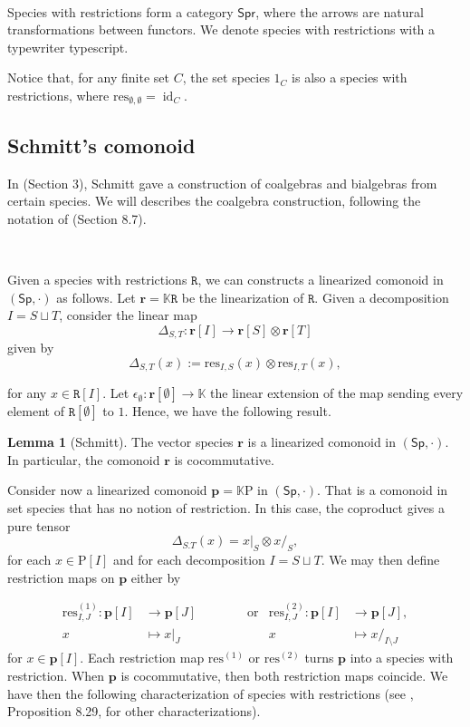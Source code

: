 \documentclass[12pt, reqno]{amsart}
\theoremstyle{definition}
\newtheorem{lm}[thm]{Lemma}
\DeclareMathOperator{\id}{id}
\newcommand{\Ss}{\mathsf{Sp}} %
\newcommand{\Spr}{\mathsf{Spr}} %
\newcommand{\rP}{\mathrm{P}}
\newcommand{\prR}{\mathtt{R}}
\newcommand{\tp}{\mathbf{p}}
\newcommand{\trr}{\mathbf{r}}
\begin{document}
\

Species with restrictions form a category $\Spr$, where the arrows are natural transformations between functors.
We denote species with restrictions with a typewriter typescript.

Notice that, for any finite set $C$, the set species $\mathrm{1}_C$ is also a species with restrictions, where $\text{res}_{\emptyset, \emptyset} = \id_C$.
\

\subsection{Schmitt's comonoid}
In \cite{Schmitt1993} (Section 3), Schmitt gave a construction of coalgebras and bialgebras from certain species. We will describes the coalgebra construction, following the notation of \cite{AM2010} (Section 8.7).

\

Given a species with restrictions $\prR$, we can constructs a linearized comonoid in $(\Ss, \cdot)$ as follows. Let $\trr=\mathbb{K}\prR$ be the linearization of $\prR$. Given a decomposition $I=S \sqcup T$, consider the linear map
\[
\Delta_{S,T}: \trr[I]\to \trr[S] \otimes \trr[T]
\]
given by
\[\Delta_{S,T}(x):=\text{res}_{I,S}(x)\otimes \text{res}_{I,T}(x),\]

for any $x \in \prR[I]$. Let $\epsilon_\emptyset: \trr[\emptyset]\to \mathbb{K}$ the linear extension of the map sending every element of $\prR[\emptyset]$ to $1$. Hence, we have the following result.

\begin{lm}[Schmitt]
The vector species $\trr$ is a linearized comonoid in $(\Ss, \cdot)$. In particular, the comonoid $\trr$ is cocommutative.
\end{lm}


Consider now a linearized comonoid $\tp=\mathbb{K}\rP$ in $(\Ss, \cdot)$. 
That is a comonoid in set species that has no notion of restriction.
In this case, the coproduct gives a pure tensor
\[\Delta_{S.T}(x)=x|_S \otimes x/_S,\]
for each $x \in \rP[I]$ and for each decomposition $I = S \sqcup T$. We may then define restriction maps on $\tp$ either by

\begin{align*}
\text{res}^{(1)}_{I,J}: \tp[I] &\to \tp[J] \qquad \qquad  \text{or}  &\text{res}^{(2)}_{I,J}: \tp[I] &\to \tp[J],\\
x&\mapsto x|_J \qquad &x&\mapsto x/_{I\setminus J}
\end{align*} 
for $x \in \tp[I]$. Each restriction map $\text{res}^{(1)}$ or $\text{res}^{(2)}$ turns $\tp$ into a species with restriction. When $\tp$ is cocommutative, then both restriction maps coincide. We have then the following characterization of species with restrictions (see \cite{AM2010}, Proposition 8.29, for other characterizations).
\end{document}
